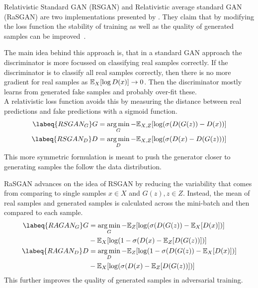Relativistic Standard GAN (RSGAN) and Relativistic average standard GAN (RaSGAN) are two implementations presented by \citeauthor*{RGAN}.
They claim that by modifying the loss function the stability of training as well as the quality of generated samples can be improved~\cite{RGAN}.

The main idea behind this approach is, that in a standard GAN approach the discriminator is more focussed on classifying real samples correctly.
If the discriminator is to classify all real samples correctly, then there is no more gradient for real samples as $ \mathbb{E}_X[\log D(x)] \rightarrow 0$.
Then the discriminator mostly learns from generated fake samples and probably over-fit these.\\
A relativistic loss function avoids this by measuring the distance between real predictions and fake predictions with a sigmoid function.
\begin{align}
    \labeq{RSGAN_G}
    G & = \argmin_G - \E_{X, Z}[\log(\sigma(D(G(z)) - D(x))] \\
    \labeq{RSGAN_D}
    D & = \argmin_D - \E_{X, Z}[\log(\sigma(D(x) - D(G(z)))]
\end{align}
This more symmetric formulation is meant to push the generator closer to generating samples the follow the data distribution.

RaSGAN advances on the idea of RSGAN by reducing the variability that comes from comparing to single samples $x \in X$ and $G(z), z \in Z$.
Instead, the mean of real samples and generated samples is calculated across the mini-batch and then compared to each sample.
\begin{align}
    \labeq{RAGAN_G}
    G & = \argmin_G - \E_Z[\log(\sigma(D(G(z)) - \E_X[D(x)])] \\
    \nonumber
    & - \E_X[\log(1 - \sigma(D(x) - \E_Z[D(G(z))])]\\
    \labeq{RAGAN_D}
    D & = \argmin_D - \E_Z[\log(1 - \sigma(D(G(z)) - \E_X[D(x)])] \\
    \nonumber
    & - \E_X[\log(\sigma(D(x) - \E_Z[D(G(z))])]
\end{align}
This further improves the quality of generated samples in adversarial training.

